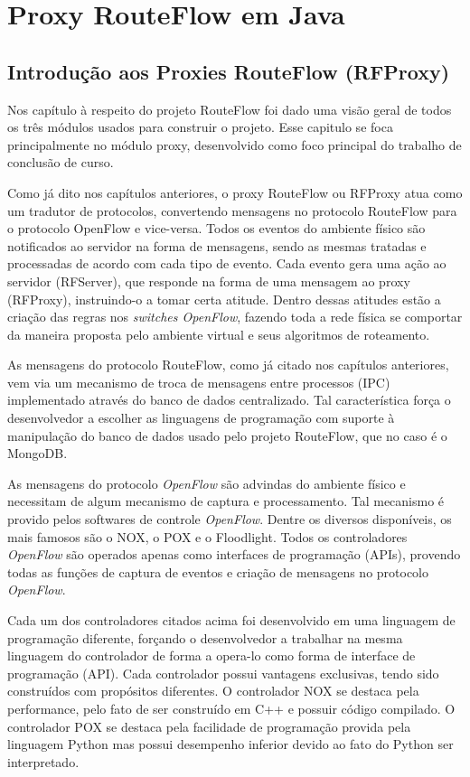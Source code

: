 \chapter{Proxy RouteFlow em Java}

\section{Introdução aos Proxies RouteFlow (RFProxy)}

Nos capítulo à respeito do projeto RouteFlow foi dado
uma visão geral de todos os três módulos usados para
construir o projeto. Esse capitulo se foca principalmente no 
módulo proxy, desenvolvido como foco principal do trabalho de
conclusão de curso.

Como já dito nos capítulos anteriores, o proxy RouteFlow ou
RFProxy atua como um tradutor de protocolos, convertendo
mensagens no protocolo RouteFlow para o protocolo OpenFlow
e vice-versa. Todos os eventos do ambiente físico são notificados
ao servidor na forma de mensagens, sendo as mesmas tratadas 
e processadas de acordo com cada tipo de evento. Cada evento gera uma 
ação ao servidor (RFServer), que responde na forma de uma 
mensagem ao proxy (RFProxy), instruindo-o a tomar certa atitude.
Dentro dessas atitudes estão a criação das regras nos \textit{
switches OpenFlow}, fazendo toda a rede física se comportar
da maneira proposta pelo ambiente virtual e seus algoritmos de
roteamento.

As mensagens do protocolo RouteFlow, como já citado nos
capítulos anteriores, vem via um mecanismo de troca de mensagens
entre processos (IPC) implementado através do banco de dados
centralizado. Tal característica força o desenvolvedor a escolher
as linguagens de programação com suporte à manipulação do
banco de dados usado pelo projeto RouteFlow, que no caso
é o MongoDB.

As mensagens do protocolo \textit{OpenFlow} são advindas do ambiente
físico e necessitam de algum mecanismo de captura e processamento.
Tal mecanismo é provido pelos softwares de controle \textit{
OpenFlow}. Dentre os diversos disponíveis, os mais famosos
são o NOX, o POX e o Floodlight. Todos os controladores
\textit{OpenFlow} são operados apenas como 
interfaces de programação (APIs), provendo todas as funções de captura
de eventos e criação de mensagens no protocolo \textit{OpenFlow}.

Cada um dos controladores citados acima foi desenvolvido em
uma linguagem de programação diferente, forçando o desenvolvedor
a trabalhar na mesma linguagem do controlador de forma a 
opera-lo como forma de interface de programação (API). 
Cada controlador possui vantagens exclusivas, tendo sido construídos
com propósitos diferentes. O controlador NOX se destaca pela
performance, pelo fato de ser construído em C++ e possuir
código compilado. O controlador POX se destaca pela
facilidade de programação provida pela linguagem Python mas
possui desempenho inferior devido ao fato do Python ser
interpretado. 

